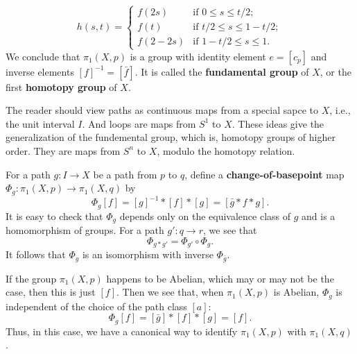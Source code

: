 \[h(s,t)=\begin{cases}
f(2s)&\text{if }0\leq s\leq t/2;\\
f(t)&\text{if }t/2\leq s\leq 1-t/2;\\
f(2-2s)&\text{if }1-t/2\leq s\leq 1.
\end{cases}\]
We conclude that $\pi_1(X,p)$ is a group with identity element $e=[c_p]$ and inverse elements $[f]^{-1}=[\bar{f}]$. It is called the \textbf{fundamental group} of $X$, or the first \textbf{homotopy group} of $X$.
\begin{remark}
The reader should view paths as continuous maps from a special sapce to $X$, i.e., the unit interval $I$. And loops are maps from $S^1$ to $X$. These ideas give the generalization of the fundemental group, which is, homotopy groups of higher order. They are maps from $S^n$ to $X$, modulo the homotopy relation.
\end{remark}
\begin{remark}
For a path $g:I\to X$ be a path from $p$ to $q$, define a \textbf{change-of-basepoint} map $\varPhi_{g}:\pi_1(X,p)\to\pi_1(X,q)$ by \[\varPhi_{g}[f]=[g]^{-1}\ast[f]\ast[g]=[\bar{g}\ast f\ast g].\]
It is easy to check that $\varPhi_{g}$ depends only on the equivalence class of $g$ and is a homomorphism of groups. For a path $g':q\to r$, we see that \[\varPhi_{g\ast g'}=\varPhi_{g'}\circ\varPhi_{g}.\]
It follows that $\varPhi_{g}$ is an isomorphism with inverse $\varPhi_{\bar{g}}$.\par
If the group $\pi_1(X,p)$ happens to be Abelian, which may or may not be the case, then this is just $[f]$. Then we see that, when $\pi_1(X,p)$ is Abelian, $\varPhi_{g}$ is independent of the choice of the path class $[a]$:
\[\varPhi_{g}[f]=[\bar{g}]\ast[f]\ast[g]=[f].\]
Thus, in this case, we have a canonical way to identify $\pi_1(X,p)$ with $\pi_1(X,q)$.
\end{remark}
